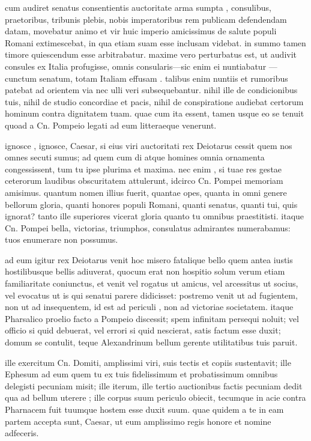  cum audiret senatus consentientis auctoritate arma sumpta , consulibus, praetoribus, tribunis plebis, nobis imperatoribus rem publicam defendendam datam, movebatur animo et vir huic imperio amicissimus de salute populi Romani extimescebat, in qua etiam suam esse inclusam videbat. in summo tamen timore quiescendum esse arbitrabatur. maxime vero perturbatus est, ut audivit consules ex Italia profugisse, omnis consularis—sic enim ei nuntiabatur —cunctum senatum, totam Italiam effusam . talibus enim nuntiis et rumoribus patebat ad orientem via nec ulli veri subsequebantur. nihil ille de condicionibus tuis, nihil de studio concordiae et pacis, nihil de conspiratione audiebat certorum hominum contra dignitatem tuam. quae cum ita essent, tamen usque eo se tenuit quoad a Cn. Pompeio legati ad eum litteraeque venerunt.

 ignosce , ignosce, Caesar, si eius viri auctoritati rex Deiotarus cessit quem nos omnes secuti sumus; ad quem cum di atque homines omnia ornamenta congessissent, tum tu ipse plurima et maxima. nec enim , si tuae res gestae ceterorum laudibus obscuritatem attulerunt, idcirco Cn. Pompei memoriam amisimus. quantum nomen illius fuerit, quantae opes, quanta in omni genere bellorum gloria, quanti honores populi Romani, quanti senatus, quanti tui, quis ignorat? tanto ille superiores vicerat gloria quanto tu omnibus praestitisti. itaque Cn. Pompei bella, victorias, triumphos, consulatus admirantes numerabamus: tuos enumerare non possumus.

 ad eum igitur rex Deiotarus venit hoc misero fatalique bello quem antea iustis hostilibusque bellis adiuverat, quocum erat non hospitio solum verum etiam familiaritate coniunctus, et venit vel rogatus ut amicus, vel arcessitus ut socius, vel evocatus ut is qui senatui parere didicisset: postremo venit ut ad fugientem, non ut ad insequentem, id est ad periculi , non ad victoriae societatem. itaque Pharsalico proelio facto a Pompeio discessit; spem infinitam persequi noluit; vel officio si quid debuerat, vel errori si quid nescierat, satis factum esse duxit; domum se contulit, teque Alexandrinum bellum gerente utilitatibus tuis paruit.

 ille exercitum Cn. Domiti, amplissimi viri, suis tectis et copiis sustentavit; ille Ephesum ad eum quem tu ex tuis fidelissimum et probatissimum omnibus delegisti pecuniam misit; ille iterum, ille tertio auctionibus factis pecuniam dedit qua ad bellum uterere ; ille corpus suum periculo obiecit, tecumque in acie contra Pharnacem fuit tuumque hostem esse duxit suum. quae quidem a te in eam partem accepta sunt, Caesar, ut eum amplissimo regis honore et nomine adfeceris.

